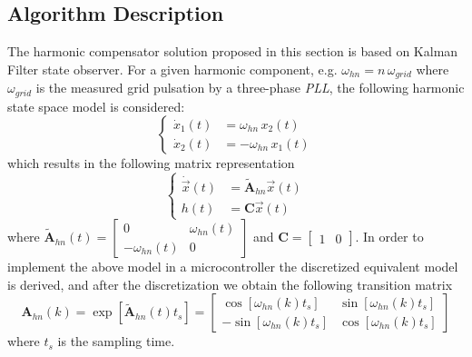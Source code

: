 \documentclass[11pt,a4paper,oneside]{book}
\numberwithin{equation}{section}
\theoremstyle{it}
\theoremstyle{definition}
\begin{document}
\begin{onehalfspace}
\section{Algorithm Description}
The harmonic compensator solution proposed in this section is based on Kalman Filter state observer. For a given harmonic component, e.g. $\omega_{hn}=n\,\omega_{grid}$ where $\omega_{grid}$ is the measured grid pulsation by a three-phase \textit{PLL}, the following harmonic state space model is considered:
\begin{equation}
	\left\lbrace 
	\begin{aligned}
		\dot{x}_1(t) &= \omega_{hn}\,x_2(t) \\[6pt]
		\dot{x}_2(t) &= -\omega_{hn}\,x_1(t)
	\end{aligned}\right. 
\end{equation} 
which results in the following matrix representation
\begin{equation}
	\left\lbrace \begin{aligned}
		\dot{\vec{x}}(t) &= \tilde{\mathbf{A}}_{hn}{\vec{x}}(t) \\[6pt]
		h(t) &= \mathbf{C}{\vec{x}}(t)
	\end{aligned}\right. 
\end{equation} 
where $\tilde{\mathbf{A}}_{hn}(t) = \begin{bmatrix} 0 & \omega_{hn}(t) \\ -\omega_{hn}(t) & 0 
\end{bmatrix}$ and $\mathbf{C} = \begin{bmatrix} 1 & 0 \end{bmatrix}$. 
In order to implement the above model in a microcontroller the discretized equivalent model is derived, and after the discretization we obtain the following transition matrix
\begin{equation}
	\mathbf{A}_{hn}(k) = \exp{\left[\tilde{\mathbf{A}}_{hn}(t)t_s\right]}=\begin{bmatrix}
		\cos[\omega_{hn}(k) t_s] & \sin[\omega_{hn}(k) t_s] \\[6pt] -\sin[\omega_{hn}(k) t_s] & \cos[\omega_{hn}(k)t_s]
	\end{bmatrix}
\end{equation}
where $t_s$ is the sampling time.


\end{onehalfspace}
\end{document}
